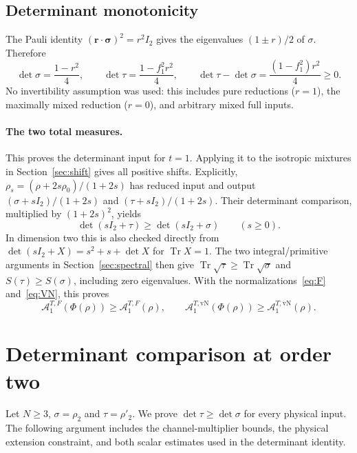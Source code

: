 \documentclass[11pt,a4paper]{article}
\newcommand{\A}{\mathcal A}
\begin{document}
\subsection{Determinant monotonicity}
The Pauli identity $(\mathbf r\cdot\boldsymbol\sigma)^2=r^2I_2$
gives the eigenvalues $(1\pm r)/2$ of $\sigma$. Therefore
\[
 \det\sigma=\frac{1-r^2}{4},\qquad
 \det\tau=\frac{1-f_1^2r^2}{4},\qquad
 \boxed{\det\tau-\det\sigma=\frac{(1-f_1^2)r^2}{4}\ge0.}
\]
No invertibility assumption was used: this includes pure reductions
($r=1$), the maximally mixed reduction ($r=0$), and arbitrary mixed
full inputs.

\paragraph{The two total measures.}
This proves the determinant input for $t=1$. Applying it to the isotropic
mixtures in Section~\ref{sec:shift} gives all positive shifts.
Explicitly, $\rho_s=(\rho+2s\rho_0)/(1+2s)$ has reduced input and output
$(\sigma+sI_2)/(1+2s)$ and $(\tau+sI_2)/(1+2s)$. Their determinant
comparison, multiplied by $(1+2s)^2$, yields
\[
 \det(sI_2+\tau)\ge\det(sI_2+\sigma)\qquad(s\ge0).
\]
In dimension two this is also checked directly from
$\det(sI_2+X)=s^2+s+\det X$ for $\operatorname{Tr}X=1$.
The two integral/primitive arguments in Section~\ref{sec:spectral}
then give $\operatorname{Tr}\sqrt\tau\ge\operatorname{Tr}\sqrt\sigma$
and $S(\tau)\ge S(\sigma)$, including zero eigenvalues. With the
normalizations~\eqref{eq:F} and~\eqref{eq:VN}, this proves
\[
 \boxed{\A_1^{T,F}(\Phi(\rho))\ge\A_1^{T,F}(\rho),\qquad
 \A_1^{T,\mathrm{vN}}(\Phi(\rho))\ge\A_1^{T,\mathrm{vN}}(\rho).}
\]

\clearpage
\section{Determinant comparison at order two}\label{sec:t2}
Let $N\ge3$, $\sigma=\rho_2$ and $\tau=\rho'_2$. We prove
$\det\tau\ge\det\sigma$ for every physical input. The following argument
includes the channel-multiplier bounds, the physical extension constraint,
and both scalar estimates used in the determinant identity.
\end{document}
